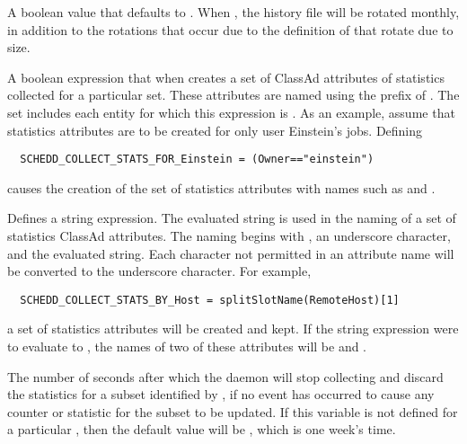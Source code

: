 \begin{description}
\label{param:RotateHistoryMonthly}
\item[\Macro{ROTATE\_HISTORY\_MONTHLY}]
  A boolean value that defaults to .
  When , the history file will be rotated monthly,
  in addition to the rotations that occur due to the definition of  
   that rotate due to size.


\label{param:ScheddCollectStatsForName}
\item[\Macro{SCHEDD\_COLLECT\_STATS\_FOR\_<Name>}]
  A boolean expression that when  creates a set of 
  ClassAd attributes of statistics collected for a particular set.
  These attributes are named using the prefix of .
  The set includes each entity for which this expression is .
  As an example, assume that  statistics attributes are to
  be created for only user Einstein's jobs.
  Defining
\begin{verbatim}
  SCHEDD_COLLECT_STATS_FOR_Einstein = (Owner=="einstein")
\end{verbatim}
  causes the creation of the set of statistics attributes with names such as
   and .

\label{param:ScheddCollectStatsByName}
\item[\Macro{SCHEDD\_COLLECT\_STATS\_BY\_<Name>}]
  Defines a string expression.  The evaluated string is used in the naming of 
  a set of  statistics ClassAd attributes.
  The naming begins with , an underscore character, 
  and the evaluated string.
  Each character not permitted in an attribute name will be converted
  to the underscore character.
  For example,
\footnotesize
\begin{verbatim}
  SCHEDD_COLLECT_STATS_BY_Host = splitSlotName(RemoteHost)[1]
\end{verbatim}
\normalsize
  a set of statistics attributes will be created and kept. 
  If the string expression were to evaluate to ,
  the names of two of these attributes will be
   and 
  .
  
\label{param:ScheddExpireStatsByName}
\item[\Macro{SCHEDD\_EXPIRE\_STATS\_BY\_<Name>}]
  The number of seconds after which the  daemon will stop
  collecting and discard the statistics for a subset 
  identified by ,
  if no event has occurred to cause any counter or statistic for the subset
  to be updated. 
  If this variable is not defined for a particular ,
  then the default value will be , which is one week's time.


\end{description}
